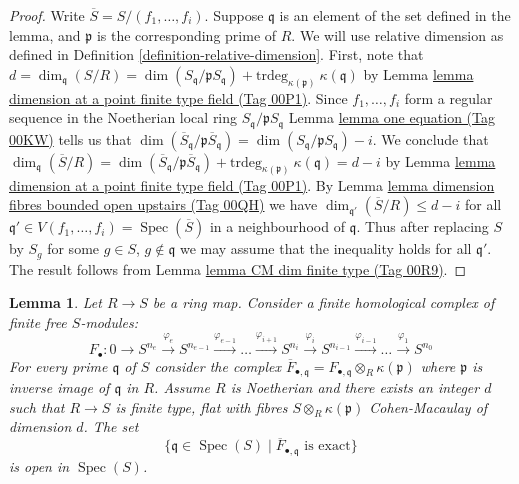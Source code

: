 \documentclass{amsart}
\theoremstyle{plain}
\newtheorem{lemma}[subsection]{Lemma}
\theoremstyle{definition}
\theoremstyle{remark}
\numberwithin{equation}{subsection}
\def\Spec{\mathop{\mathrm{Spec}}}
\begin{document}
\begin{proof}
Write $\overline{S} = S/(f_1, \ldots, f_i)$.
Suppose $\mathfrak q$ is an element of the set defined in the
lemma, and $\mathfrak p$ is the corresponding prime of $R$.
We will use relative dimension as defined in
Definition \ref{definition-relative-dimension}.
First, note that $d = \dim_{\mathfrak q}(S/R) =
\dim(S_{\mathfrak q}/\mathfrak pS_{\mathfrak q}) +
\text{trdeg}_{\kappa(\mathfrak p)}\ \kappa(\mathfrak q)$
by Lemma \href{https://stacks.math.columbia.edu/tag/00P1}{lemma dimension at a point finite type field (Tag 00P1)}.
Since $f_1, \ldots, f_i$ form a regular sequence in the
Noetherian local ring $S_{\mathfrak q}/\mathfrak pS_{\mathfrak q}$
Lemma \href{https://stacks.math.columbia.edu/tag/00KW}{lemma one equation (Tag 00KW)} tells us that
$\dim(\overline{S}_{\mathfrak q}/\mathfrak p\overline{S}_{\mathfrak q})
= \dim(S_{\mathfrak q}/\mathfrak pS_{\mathfrak q}) - i$.
We conclude that $\dim_{\mathfrak q}(\overline{S}/R)
= \dim(\overline{S}_{\mathfrak q}/\mathfrak p\overline{S}_{\mathfrak q}) +
\text{trdeg}_{\kappa(\mathfrak p)}\ \kappa(\mathfrak q)
= d - i$ by Lemma \href{https://stacks.math.columbia.edu/tag/00P1}{lemma dimension at a point finite type field (Tag 00P1)}.
By Lemma \href{https://stacks.math.columbia.edu/tag/00QH}{lemma dimension fibres bounded open upstairs (Tag 00QH)}
we have $\dim_{\mathfrak q'}(\overline{S}/R) \leq d - i$
for all $\mathfrak q' \in V(f_1, \ldots, f_i) = \Spec(\overline{S})$
in a neighbourhood of $\mathfrak q$. Thus after replacing
$S$ by $S_g$ for some $g \in S$, $g \not \in \mathfrak q$
we may assume that the inequality holds for all
$\mathfrak q'$. The result follows from Lemma
\href{https://stacks.math.columbia.edu/tag/00R9}{lemma CM dim finite type (Tag 00R9)}.
\end{proof}


\begin{lemma}
\label{lemma-exact-on-fibres-open}
Let $R \to S$ be a ring map. Consider a finite homological complex of
finite free $S$-modules:
$$
F_{\bullet} :
0
\to
S^{n_e}
\xrightarrow{\varphi_e}
S^{n_{e-1}}
\xrightarrow{\varphi_{e-1}}
\ldots
\xrightarrow{\varphi_{i + 1}}
S^{n_i}
\xrightarrow{\varphi_i}
S^{n_{i-1}}
\xrightarrow{\varphi_{i-1}}
\ldots
\xrightarrow{\varphi_1}
S^{n_0}
$$
For every prime $\mathfrak q$ of $S$ consider the
complex $\overline{F}_{\bullet, \mathfrak q} =
F_{\bullet, \mathfrak q} \otimes_R \kappa(\mathfrak p)$
where $\mathfrak p$ is inverse image of $\mathfrak q$ in $R$.
Assume $R$ is Noetherian and there exists an integer $d$ such
that $R \to S$ is finite type, flat
with fibres $S \otimes_R \kappa(\mathfrak p)$
Cohen-Macaulay of dimension $d$.
The set
$$
\{\mathfrak q \in \Spec(S) \mid
\overline{F}_{\bullet, \mathfrak q}\text{ is exact}\}
$$
is open in $\Spec(S)$.
\end{lemma}
\end{document}
